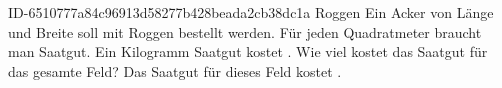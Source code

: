 \begin{exercise}
      {ID-6510777a84c96913d58277b428beada2cb38dc1a}
      {Roggen}
  \ifproblem\problem
    Ein Acker von  Länge und  Breite soll mit Roggen bestellt
    werden. Für jeden Quadratmeter braucht man  Saatgut. Ein Kilogramm
    Saatgut kostet . Wie viel kostet das Saatgut für das gesamte Feld?
  \fi
  \ifoutcome\outcome
    Das Saatgut für dieses Feld kostet .
  \fi
\end{exercise}
